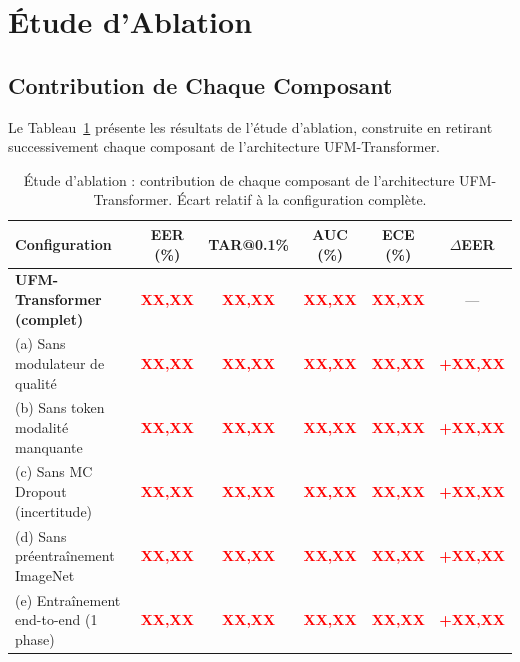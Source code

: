 \documentclass[12pt,a4paper]{report}
\begin{document}
\section{\'{E}tude d'Ablation}
\label{sec:ablation}

\subsection{Contribution de Chaque Composant}

Le Tableau~\ref{tab:ablation} pr\'{e}sente les r\'{e}sultats de l'\'{e}tude d'ablation, construite en retirant successivement chaque composant de l'architecture UFM-Transformer.

\begin{table}[htbp]
    \centering
    \caption{\'{E}tude d'ablation : contribution de chaque composant de l'architecture UFM-Transformer. \'{E}cart relatif \`{a} la configuration compl\`{e}te.}
    \label{tab:ablation}
    \begin{tabular}{lccccc}
        \hline
        \hline
        \textbf{Configuration} & \textbf{EER (\%)} & \textbf{TAR@0.1\%} & \textbf{AUC (\%)} & \textbf{ECE (\%)} & \textbf{$\Delta$EER} \\
        \hline
        \rowcolor{gray!15}
        \textbf{UFM-Transformer (complet)} & \textcolor{red}{\textbf{XX,XX}} & \textcolor{red}{\textbf{XX,XX}} & \textcolor{red}{\textbf{XX,XX}} & \textcolor{red}{\textbf{XX,XX}} & --- \\
        \quad (a) Sans modulateur de qualit\'{e} & \textcolor{red}{\textbf{XX,XX}} & \textcolor{red}{\textbf{XX,XX}} & \textcolor{red}{\textbf{XX,XX}} & \textcolor{red}{\textbf{XX,XX}} & \textcolor{red}{\textbf{+XX,XX}} \\
        \quad (b) Sans token modalit\'{e} manquante & \textcolor{red}{\textbf{XX,XX}} & \textcolor{red}{\textbf{XX,XX}} & \textcolor{red}{\textbf{XX,XX}} & \textcolor{red}{\textbf{XX,XX}} & \textcolor{red}{\textbf{+XX,XX}} \\
        \quad (c) Sans MC Dropout (incertitude) & \textcolor{red}{\textbf{XX,XX}} & \textcolor{red}{\textbf{XX,XX}} & \textcolor{red}{\textbf{XX,XX}} & \textcolor{red}{\textbf{XX,XX}} & \textcolor{red}{\textbf{+XX,XX}} \\
        \quad (d) Sans pr\'{e}entra\^{i}nement ImageNet & \textcolor{red}{\textbf{XX,XX}} & \textcolor{red}{\textbf{XX,XX}} & \textcolor{red}{\textbf{XX,XX}} & \textcolor{red}{\textbf{XX,XX}} & \textcolor{red}{\textbf{+XX,XX}} \\
        \quad (e) Entra\^{i}nement end-to-end (1 phase) & \textcolor{red}{\textbf{XX,XX}} & \textcolor{red}{\textbf{XX,XX}} & \textcolor{red}{\textbf{XX,XX}} & \textcolor{red}{\textbf{XX,XX}} & \textcolor{red}{\textbf{+XX,XX}} \\
        \hline
        \hline
    \end{tabular}
\end{table}
\end{document}
